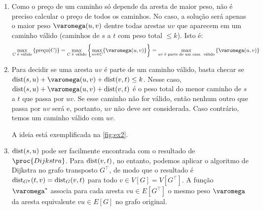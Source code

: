 \begin{enumerate}
    \item Como o preço de um caminho só depende da aresta de maior peso, não é preciso calcular o preço de todos os caminhos. No caso, a solução será apenas o maior peso $\varomega(u, v)$ dentre todas arestas $u v$ que aparecem em um caminho válido (caminhos de $s$ a $t$ com peso total $\leq k$). Isto é:
    \[
        \max_{C\text{ é válido}}\set{\text{preço}(C)}
        = \max_{C\text{ é válido}} \set{\max_{u v \in C}\{\varomega(u, v)\}}
        = \max_{u v\text{ é parte de um cam. válido}} \set{\varomega(u, v)}
    \]

    \item Para decidir se uma aresta $u v$ é parte de um caminho válido, basta checar se \\ $\dist(s, u) + \varomega(u, v) + \dist(v, t) \leq k$. Nesse caso, $\dist(s, u) + \varomega(u, v) + \dist(v, t)$ é o peso total do menor caminho de $s$ a $t$ que passa por $u v$. Se esse caminho não for válido, então nenhum outro que passa por $u v$ será e, portanto, $u v$ não deve ser considerada. Caso contrário, temos um caminho válido com $u v$.

    A ideia está exemplificada na \cref{fig:ex2}.

    \item $\operatorname{dist}(s, u)$ pode ser facilmente encontrada com o resultado de $\proc{Dijkstra}$. Para $\operatorname{dist}(v, t)$, no entanto, podemos aplicar o algoritmo de Dijkstra no grafo transposto $G^\intercal$, de modo que o resultado é $\operatorname{dist}_{G^\intercal}(t, v) = \operatorname{dist}_{G}(v, t)$ para todo $v \in V[G] = V[G^\intercal]$. A função $\varomega^*$ associa para cada aresta $v u \in E[G^\intercal]$ o mesmo peso $\varomega$ da aresta equivalente $v u \in E[G]$ no grafo original.
\end{enumerate}

